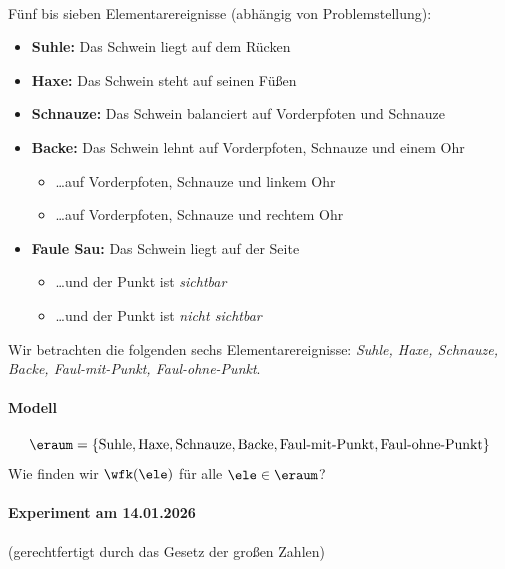 
\begin{bsp}[Schweinewürfeln] \\
    Fünf bis sieben Elementarereignisse (abhängig von Problemstellung):

    \begin{itemize}
        \item \textbf{Suhle:} Das Schwein liegt auf dem Rücken
        \item \textbf{Haxe:} Das Schwein steht auf seinen Füßen
        \item \textbf{Schnauze:} Das Schwein balanciert auf Vorderpfoten und Schnauze
        \item \textbf{Backe:} Das Schwein lehnt auf Vorderpfoten, Schnauze und einem Ohr
        \begin{itemize}
            \item \dots auf Vorderpfoten, Schnauze und linkem Ohr
            \item \dots auf Vorderpfoten, Schnauze und rechtem Ohr
        \end{itemize}
        \item \textbf{Faule Sau:} Das Schwein liegt auf der Seite
        \begin{itemize}
            \item \dots und der Punkt ist \emph{sichtbar}
            \item \dots und der Punkt ist \emph{nicht sichtbar}
        \end{itemize}
    \end{itemize}

    Wir betrachten die folgenden sechs Elementarereignisse:
    \emph{Suhle, Haxe, Schnauze, Backe, Faul-mit-Punkt, Faul-ohne-Punkt}.


    \paragraph{Modell}
    \[
        \eraum = \{\text{Suhle}, \text{Haxe}, \text{Schnauze}, \text{Backe}, \text{Faul-mit-Punkt}, \text{Faul-ohne-Punkt}\}
    \]
    Wie finden wir $\wfk(\ele)$ für alle $\ele \in \eraum$?

    \paragraph{Experiment am 14.01.2026} (gerechtfertigt durch das Gesetz der großen Zahlen)


\end{bsp}
